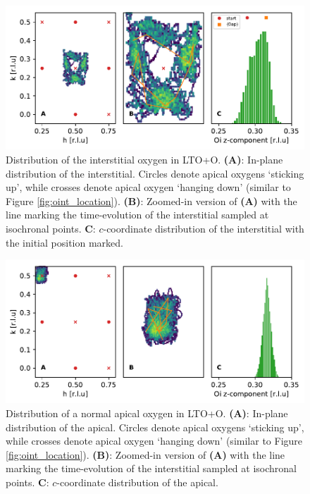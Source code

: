 \begin{figure}
	\centering
	\includegraphics[width=\textwidth]{fig/md/diffusion1.pdf}
	\caption[MD Oint Diffusion Oi]{Distribution of the interstitial oxygen in LTO+O. \textbf{(A)}: In-plane distribution of the interstitial. Circles denote apical oxygens `sticking up', while crosses denote apical oxygen `hanging down' (similar to Figure \ref{fig:oint_location}). \textbf{(B)}: Zoomed-in version of \textbf{(A)} with the line marking the time-evolution of the interstitial sampled at isochronal points. \textbf{C}: $c$-coordinate distribution of the interstitial with the initial position marked.}
	\label{fig:md_diffusion1}
\end{figure}

\begin{figure}
	\centering
	\includegraphics[width=\textwidth]{fig/md/diffusion3.pdf}
	\caption[MD Oint Diffusion Oap 2]{Distribution of a normal apical oxygen in LTO+O. \textbf{(A)}: In-plane distribution of the apical. Circles denote apical oxygens `sticking up', while crosses denote apical oxygen `hanging down' (similar to Figure \ref{fig:oint_location}). \textbf{(B)}: Zoomed-in version of \textbf{(A)} with the line marking the time-evolution of the interstitial sampled at isochronal points. \textbf{C}: $c$-coordinate distribution of the apical.}
	\label{fig:md_diffusion3}
\end{figure}

